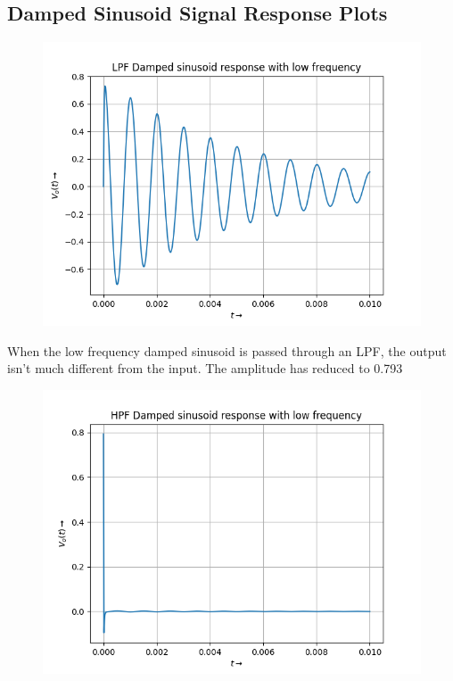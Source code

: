 \documentclass[12pt, a4paper]{article}
\begin{document}
\subsection{Damped Sinusoid Signal Response Plots}
\vspace*{-0.5cm}
\begin{figure}[H]
    \centering
    \includegraphics[scale = 0.8]{Figure_7.png}
    \label{fig:sample}
\end{figure}
\begin{center}
    When the low frequency damped sinusoid is passed through an LPF, the output isn't much different from the input. The amplitude has reduced to 0.793
\end{center}
\vspace*{-0.5cm}
\begin{figure}[H]
    \centering
    \includegraphics[scale = 0.8]{Figure_8.png}
    \label{fig:sample}
\end{figure}
\end{document}
